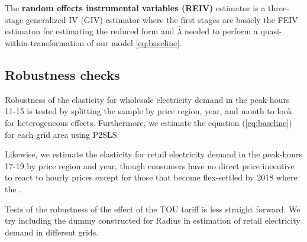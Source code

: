 \par
The \textbf{random effects instrumental variables (REIV)} estimator is a three-stage generalized IV (GIV) estimator where the first stages are basicly the FEIV estimaton for estimating the reduced form and $\widehat{\lambda}$ needed to perform a quasi-within-transformation of our model \eqref{eq:baseline}.

\subsection{Robustness checks}
\label{subsec:e_robustness}
Robustness of the elasticity for wholesale electricity demand in the peak-hours 11-15 is tested by splitting the sample by price region, year, and month to look for heterogeneous effects. Furthermore, we estimate the equation (\ref{eq:baseline}) for each grid area using P2SLS.
\par
Likewise, we estimate the elasticity for retail electricity demand in the peak-hours 17-19 by price region and year, though consumers have no direct price incentive to react to hourly prices except for those that become flex-settled by 2018 where the .
\bigskip\par
Tests of the robustness of the effect of the TOU tariff is less straight forward. We try including the dummy constructed for Radius in estimation of retail electricity demand in different grids.
